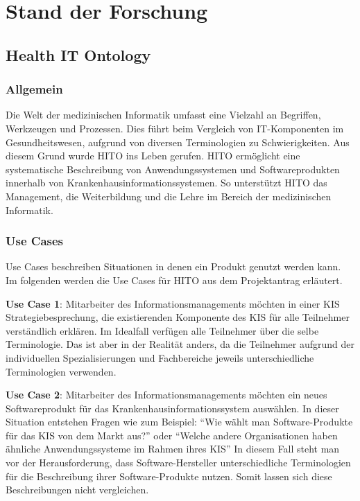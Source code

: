 \chapter{Stand der Forschung}\label{ch:relatedWork}

\section{Health IT Ontology}

\subsection{Allgemein}

Die Welt der medizinischen Informatik umfasst eine Vielzahl an Begriffen, Werkzeugen und Prozessen. 
Dies führt beim Vergleich von IT-Komponenten im Gesundheitswesen, aufgrund von diversen Terminologien zu Schwierigkeiten. 
Aus diesem Grund wurde \ac{HITO} ins Leben gerufen.
\ac{HITO} ermöglicht eine systematische Beschreibung von Anwendungssystemen und Softwareprodukten innerhalb von Krankenhausinformationssystemen.
So unterstützt \ac{HITO} das Management, die Weiterbildung und die Lehre im Bereich der medizinischen Informatik.

\subsection{Use Cases}\label{sec:usecases}

Use Cases beschreiben Situationen in denen ein Produkt genutzt werden kann.
Im folgenden werden die Use Cases für HITO aus dem Projektantrag \citep{winter_haux} erläutert. \newline

\textbf{Use Case 1}: Mitarbeiter des Informationsmanagements möchten in einer \ac{KIS} Strategiebesprechung, die existierenden Komponente des \ac{KIS} für alle Teilnehmer verständlich erklären.
Im Idealfall verfügen alle Teilnehmer über die selbe Terminologie.
Das ist aber in der Realität anders, da die Teilnehmer aufgrund der individuellen Spezialisierungen und Fachbereiche jeweils unterschiedliche Terminologien verwenden. \newline

\textbf{Use Case 2}:  Mitarbeiter des Informationsmanagements möchten ein neues Softwareprodukt für das Krankenhausinformationssystem auswählen.
In dieser Situation entstehen Fragen wie zum Beispiel: \enquote{Wie wählt man Software-Produkte für das \ac{KIS} von dem Markt aus?} oder \enquote{Welche andere Organisationen haben ähnliche Anwendungssysteme im Rahmen ihres \ac{KIS}}
In diesem Fall steht man vor der Herausforderung, dass Software-Hersteller unterschiedliche Terminologien für die Beschreibung ihrer Software-Produkte nutzen.
Somit lassen sich diese Beschreibungen nicht vergleichen. \newline

